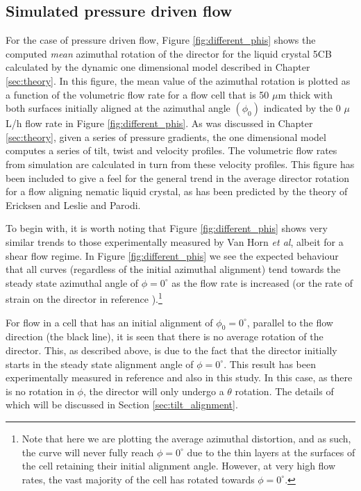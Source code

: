 \subsection{Simulated pressure driven flow}
\label{sec:simulated_flow}
For the case of pressure driven flow, Figure \ref{fig:different_phis} shows the computed \textit{mean} azimuthal rotation of the director for the liquid crystal 5CB calculated by the dynamic one dimensional model described in Chapter \ref{sec:theory}. In this figure, the mean value of the azimuthal rotation is plotted as a function of the volumetric flow rate for a flow cell that is 50 $\mu$m thick with both surfaces initially aligned at the azimuthal angle $\left(\phi_0\right)$ indicated by the 0 $\mu$L/h flow rate in Figure \ref{fig:different_phis}. As was discussed in Chapter \ref{sec:theory}, given a series of pressure gradients, the one dimensional model computes a series of tilt, twist and velocity profiles. The volumetric flow rates from simulation are calculated in turn from these velocity profiles. This figure has been included to give a feel for the general trend in the average director rotation for a flow aligning nematic liquid crystal, as has been predicted by the theory of Ericksen and Leslie and Parodi.

To begin with, it is worth noting that Figure \ref{fig:different_phis} shows very similar trends to those experimentally measured by Van Horn \textit{et al}, albeit for a shear flow regime. In Figure \ref{fig:different_phis} we see the expected behaviour that all curves (regardless of the initial azimuthal alignment) tend towards the steady state azimuthal angle of $\phi=0^{\circ}$ as the flow rate is increased (or the rate of strain on the director in reference \cite{Boudreau1999}).\footnote{Note that here we are plotting the average azimuthal distortion,  and as such, the curve will never fully reach $\phi=0^{\circ}$ due to the thin layers at the surfaces of the cell retaining their initial alignment angle. However, at very high flow rates, the vast majority of the cell has rotated towards $\phi=0^{\circ}$.}

For flow in a cell that has an initial alignment of $\phi_0=0^{\circ}$, parallel to the flow direction (the black line), it is seen that there is no average rotation of the director. This, as described above, is due to the fact that the director initially starts in the steady state alignment angle of $\phi=0^{\circ}$. This result has been experimentally measured in reference \cite{Boudreau1999} and also in this study. In this case, as there is no rotation in $\phi$, the director will only undergo a $\theta$ rotation. The details of which will be discussed in Section \ref{sec:tilt_alignment}.

